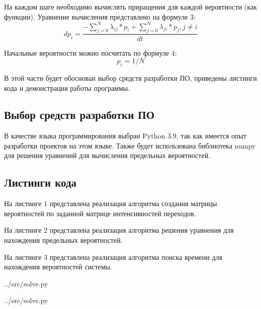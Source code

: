 На каждом шаге необходимо вычислять приращения для каждой вероятности (как функции).
Уравнение вычисления представлено на формуле 3:
\begin{equation}
	dp_i = \frac{-\sum_{j = 0}^{N}{\lambda_{ij}} *p_i + \sum_{j = 0}^{N} \lambda_{ji}*p_j, j \neq i}{dt}
\end{equation}

Начальные вероятности можно посчитать по формуле 4:
\begin{equation}
	p_{i} = 1 / N
\end{equation}

В этой части будет обоснован выбор средств разработки ПО, приведены листинги кода и демонстрация работы программы.

\subsection*{Выбор средств разработки ПО}
В качестве языка программирования выбран Python 3.9, так как имеется опыт разработки проектов на этом языке.
Также будет использована библиотека numpy для решения уравнений для вычисления предельных вероятностей.

\newpage
\subsection*{Листинги кода}
\FloatBarrier
На листинге 1 представлена реализация алгоритма создания матрицы вероятностей по заданной матрице интенсивностей переходов.

На листинге 2 представлена реализация алгоритма решения уравнения для нахождения предельных вероятностей. 

На листинге 3 представлена реализация алгоритма поиска времени для нахождения вероятностей системы.

\begin{lstinputlisting}[language=Python, caption=Реализация алгоритма создания матрицы вероятностей, linerange={5-19}, 
	basicstyle=\footnotesize\ttfamily, frame=single,breaklines=true]{../src/solve.py}
\end{lstinputlisting}
\FloatBarrier

\FloatBarrier
\begin{lstinputlisting}[language=Python, caption=Реализация алгоритма решения уравнения для нахождения предельных вероятностей, linerange={34-38}, 
	basicstyle=\footnotesize\ttfamily, frame=single, breaklines=true]{../src/solve.py}
\end{lstinputlisting}
\FloatBarrier

